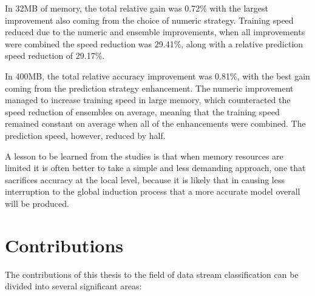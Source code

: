 In 32MB of memory, the total relative gain was 0.72\% with the largest improvement also coming from the choice of numeric strategy. Training speed reduced due to the numeric and ensemble improvements, when all improvements were combined the speed reduction was 29.41\%, along with a relative prediction speed reduction of 29.17\%. 

In 400MB, the total relative accuracy improvement was 0.81\%, with the best gain coming from the prediction strategy enhancement. The numeric improvement managed to increase training speed in large memory, which counteracted the speed reduction of ensembles on average, meaning that the training speed remained constant on average when all of the enhancements were combined. The prediction speed, however, reduced by half.

A lesson to be learned from the studies is that when memory resources are limited it is often better to take a simple and less demanding approach, one that sacrifices accuracy at the local level, because it is likely that in causing less interruption to the global induction process that a more accurate model overall will be produced.

\section{Contributions}

The contributions of this thesis to the field of data stream classification can be divided into several significant areas:

